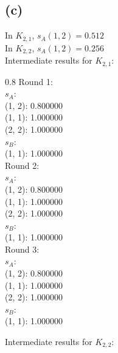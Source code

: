 \documentclass{article}
\newenvironment{myenv}[1]
  {\begin{spacing}{#1}}
  {\end{spacing}}
\begin{document}
\subsection{(c)}
In $K_{2,1}$, $s_A(1, 2) = 0.512$ \\
In $K_{2,2}$, $s_A(1, 2) = 0.256$ \\

Intermediate results for $K_{2,1}$: \\
\begin{myenv}{0.8}
Round 1:\\ 
$s_A$:\\
(1, 2): 0.800000 \\
(1, 1): 1.000000 \\
(2, 2): 1.000000 \\
$s_B$:\\
(1, 1): 1.000000 \\
Round 2:\\ 
$s_A$:\\
(1, 2): 0.800000 \\
(1, 1): 1.000000 \\
(2, 2): 1.000000 \\
$s_B$:\\
(1, 1): 1.000000 \\
Round 3:\\ 
$s_A$:\\
(1, 2): 0.800000 \\
(1, 1): 1.000000 \\
(2, 2): 1.000000 \\
$s_B$:\\
(1, 1): 1.000000 \\
\end{myenv}

Intermediate results for $K_{2,2}$: \\
\end{document}
